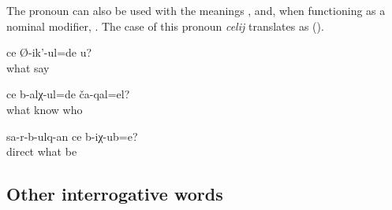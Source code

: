 The pronoun    can also be used with the meanings  ,   and, when functioning as a nominal modifier, . The  case of this pronoun \textit{celij} translates as  ().
%
\begin{exe}
	\ex	\label{ex:What do you (masc.) say}
	\gll	ce	Ø-ik'-ul=de	u?\\
		what	say	\\
	\glt	{}

	\ex	\label{ex:How do you know who they are}
	\gll	ce	b-alχ-ul=de	ča-qal=el?\\
		what	know	who\\
	\glt	{}

	\ex	\label{ex:(The picture on which the people) run away, where is it}
	\gll	sa-r-b-ulq-an	ce	b-iχ-ub=e?\\
		direct	what	be\\
	\glt	{}
\end{exe}



\subsection{Other interrogative words}
\label{ssec:Other interrogative pronouns}



\subsubsection{ }
\label{sssec:cina where}

